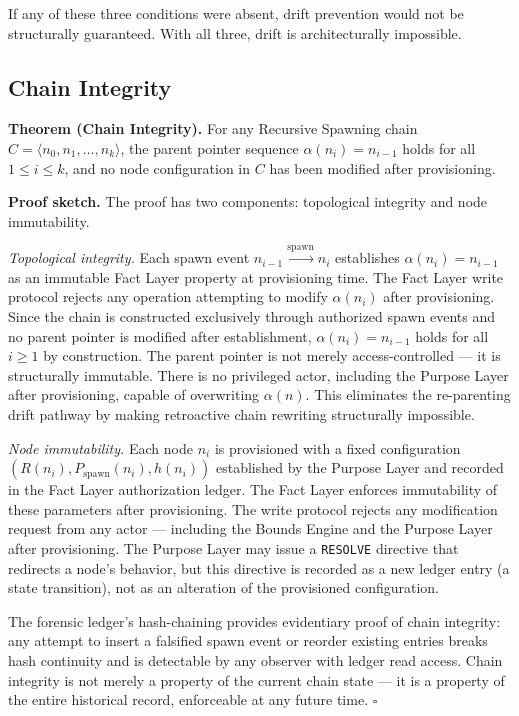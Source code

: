 If any of these three conditions were absent, drift prevention would not be structurally guaranteed. With all three, drift is architecturally impossible.

\subsection{Chain Integrity}
\label{sec:rs-chain-integrity}

\medskip
\noindent\textbf{Theorem (Chain Integrity).} For any Recursive Spawning chain $C = \langle n_0, n_1, \ldots, n_k \rangle$, the parent pointer sequence $\alpha(n_i) = n_{i-1}$ holds for all $1 \leq i \leq k$, and no node configuration in $C$ has been modified after provisioning.

\medskip
\noindent\textbf{Proof sketch.} The proof has two components: topological integrity and node immutability.

\medskip
\textit{Topological integrity.} Each spawn event $n_{i-1} \xrightarrow{\mathrm{spawn}} n_i$ establishes $\alpha(n_i) = n_{i-1}$ as an immutable Fact Layer property at provisioning time. The Fact Layer write protocol rejects any operation attempting to modify $\alpha(n_i)$ after provisioning. Since the chain is constructed exclusively through authorized spawn events and no parent pointer is modified after establishment, $\alpha(n_i) = n_{i-1}$ holds for all $i \geq 1$ by construction. The parent pointer is not merely access-controlled --- it is structurally immutable. There is no privileged actor, including the Purpose Layer after provisioning, capable of overwriting $\alpha(n)$. This eliminates the re-parenting drift pathway by making retroactive chain rewriting structurally impossible.

\medskip
\textit{Node immutability.} Each node $n_i$ is provisioned with a fixed configuration $(R(n_i), P_{\mathrm{spawn}}(n_i), h(n_i))$ established by the Purpose Layer and recorded in the Fact Layer authorization ledger. The Fact Layer enforces immutability of these parameters after provisioning. The write protocol rejects any modification request from any actor --- including the Bounds Engine and the Purpose Layer after provisioning. The Purpose Layer may issue a \texttt{RESOLVE} directive that redirects a node's behavior, but this directive is recorded as a new ledger entry (a state transition), not as an alteration of the provisioned configuration.

The forensic ledger's hash-chaining provides evidentiary proof of chain integrity: any attempt to insert a falsified spawn event or reorder existing entries breaks hash continuity and is detectable by any observer with ledger read access. Chain integrity is not merely a property of the current chain state --- it is a property of the entire historical record, enforceable at any future time. $\square$

